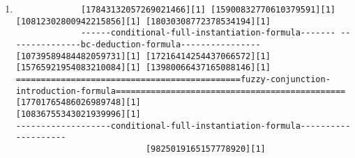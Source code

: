 \documentclass{beamer}
\begin{document}
\begin{frame}[fragile]
\begin{enumerate}
  \item
    {\Tiny
\begin{verbatim}
             [17843132057269021466][1] [15900832770610379591][1] [10812302800942215856][1] [18030308772378534194][1]
             ------conditional-full-instantiation-formula------- ---------------bc-deduction-formula----------------
[10739589484482059731][1] [17216414254437066572][1]                           [15765921954083210084][1] [13980066437165088146][1]
=============================================fuzzy-conjunction-introduction-formula==============================================
[17701765486026989748][1]                           [10836755343021939996][1]
-------------------conditional-full-instantiation-formula--------------------
                          [9825019165157778920][1]
\end{verbatim}
    }

  \end{enumerate}

\end{frame}

\end{document}
